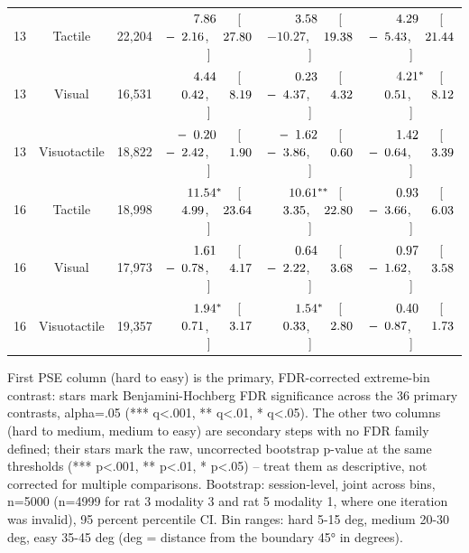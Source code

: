 \begin{table}[htbp]
{\begin{tabular}{lccccc}
\midrule
13 & Tactile & 22,204 & $\hphantom{-}\hphantom{0}7.86^{\hphantom{***}}$ [$-\hphantom{0}2.16$, $\hphantom{-}27.80$] & $\hphantom{-}\hphantom{0}3.58^{\hphantom{***}}$ [$-10.27$, $\hphantom{-}19.38$] & $\hphantom{-}\hphantom{0}4.29^{\hphantom{***}}$ [$-\hphantom{0}5.43$, $\hphantom{-}21.44$] \\
13 & Visual & 16,531 & $\hphantom{-}\hphantom{0}4.44^{\hphantom{***}}$ [$\hphantom{-}\hphantom{0}0.42$, $\hphantom{-}\hphantom{0}8.19$] & $\hphantom{-}\hphantom{0}0.23^{\hphantom{***}}$ [$-\hphantom{0}4.37$, $\hphantom{-}\hphantom{0}4.32$] & $\hphantom{-}\hphantom{0}4.21^{*\hphantom{**}}$ [$\hphantom{-}\hphantom{0}0.51$, $\hphantom{-}\hphantom{0}8.12$] \\
13 & Visuotactile & 18,822 & $-\hphantom{0}0.20^{\hphantom{***}}$ [$-\hphantom{0}2.42$, $\hphantom{-}\hphantom{0}1.90$] & $-\hphantom{0}1.62^{\hphantom{***}}$ [$-\hphantom{0}3.86$, $\hphantom{-}\hphantom{0}0.60$] & $\hphantom{-}\hphantom{0}1.42^{\hphantom{***}}$ [$-\hphantom{0}0.64$, $\hphantom{-}\hphantom{0}3.39$] \\
\midrule
16 & Tactile & 18,998 & $\hphantom{-}11.54^{*\hphantom{**}}$ [$\hphantom{-}\hphantom{0}4.99$, $\hphantom{-}23.64$] & $\hphantom{-}10.61^{**\hphantom{*}}$ [$\hphantom{-}\hphantom{0}3.35$, $\hphantom{-}22.80$] & $\hphantom{-}\hphantom{0}0.93^{\hphantom{***}}$ [$-\hphantom{0}3.66$, $\hphantom{-}\hphantom{0}6.03$] \\
16 & Visual & 17,973 & $\hphantom{-}\hphantom{0}1.61^{\hphantom{***}}$ [$-\hphantom{0}0.78$, $\hphantom{-}\hphantom{0}4.17$] & $\hphantom{-}\hphantom{0}0.64^{\hphantom{***}}$ [$-\hphantom{0}2.22$, $\hphantom{-}\hphantom{0}3.68$] & $\hphantom{-}\hphantom{0}0.97^{\hphantom{***}}$ [$-\hphantom{0}1.62$, $\hphantom{-}\hphantom{0}3.58$] \\
16 & Visuotactile & 19,357 & $\hphantom{-}\hphantom{0}1.94^{*\hphantom{**}}$ [$\hphantom{-}\hphantom{0}0.71$, $\hphantom{-}\hphantom{0}3.17$] & $\hphantom{-}\hphantom{0}1.54^{*\hphantom{**}}$ [$\hphantom{-}\hphantom{0}0.33$, $\hphantom{-}\hphantom{0}2.80$] & $\hphantom{-}\hphantom{0}0.40^{\hphantom{***}}$ [$-\hphantom{0}0.87$, $\hphantom{-}\hphantom{0}1.73$] \\
\bottomrule
\end{tabular}
}
\vspace{4pt}
\par\noindent
\begin{minipage}{\linewidth}\small First PSE column (hard to easy) is the primary, FDR-corrected extreme-bin contrast: stars mark Benjamini-Hochberg FDR significance across the 36 primary contrasts, alpha=.05 (*** q<.001, ** q<.01, * q<.05). The other two columns (hard to medium, medium to easy) are secondary steps with no FDR family defined; their stars mark the raw, uncorrected bootstrap p-value at the same thresholds (*** p<.001, ** p<.01, * p<.05) -- treat them as descriptive, not corrected for multiple comparisons. Bootstrap: session-level, joint across bins, n=5000 (n=4999 for rat 3 modality 3 and rat 5 modality 1, where one iteration was invalid), 95 percent percentile CI. Bin ranges: hard 5-15 deg, medium 20-30 deg, easy 35-45 deg (deg = distance from the boundary 45° in degrees).\end{minipage}
\end{table}